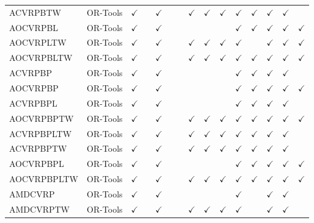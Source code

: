\documentclass{article}
\theoremstyle{plain}
\theoremstyle{definition}
\theoremstyle{remark}
\begin{document}
\begin{table}[h!]
{\begin{tabular}{l|l|cc|cccccc|ccccc}
    ACVRPBTW&OR-Tools    & $\checkmark$ & & $\checkmark$ & & & $\checkmark$ & $\checkmark$ & $\checkmark$ & $\checkmark$ & $\checkmark$ & $\checkmark$ & $\checkmark$ & \\
    AOCVRPBL&OR-Tools    & $\checkmark$ & & $\checkmark$ & & & & & & $\checkmark$ & $\checkmark$ & $\checkmark$ & $\checkmark$ & $\checkmark$ \\
    AOCVRPLTW&OR-Tools   & $\checkmark$ & & $\checkmark$ & & & $\checkmark$ & $\checkmark$ & $\checkmark$ & $\checkmark$ & & $\checkmark$ & $\checkmark$ & $\checkmark$ \\
    AOCVRPBLTW&OR-Tools  & $\checkmark$ & & $\checkmark$ & & & $\checkmark$ & $\checkmark$ & $\checkmark$ & $\checkmark$ & $\checkmark$ & $\checkmark$ & $\checkmark$ & $\checkmark$ \\
    ACVRPBP&OR-Tools     & $\checkmark$ & & $\checkmark$ & & & & & & $\checkmark$ & $\checkmark$ & $\checkmark$ & $\checkmark$ & \\
    AOCVRPBP&OR-Tools    & $\checkmark$ & & $\checkmark$ & & & & & & $\checkmark$ & $\checkmark$ & $\checkmark$ & $\checkmark$ & $\checkmark$ \\
    ACVRPBPL&OR-Tools    & $\checkmark$ & & $\checkmark$ & & & & & & $\checkmark$ & $\checkmark$ & $\checkmark$ & $\checkmark$ & \\
    AOCVRPBPTW&OR-Tools  & $\checkmark$ & & $\checkmark$ & & & $\checkmark$ & $\checkmark$ & $\checkmark$ & $\checkmark$ & $\checkmark$ & $\checkmark$ & $\checkmark$ & $\checkmark$ \\
    ACVRPBPLTW&OR-Tools   & $\checkmark$ & & $\checkmark$ & & & $\checkmark$ & $\checkmark$ & $\checkmark$ & $\checkmark$ & $\checkmark$ & $\checkmark$ & $\checkmark$ & \\
    ACVRPBPTW&OR-Tools    & $\checkmark$ & & $\checkmark$ & & & $\checkmark$ & $\checkmark$ & $\checkmark$ & $\checkmark$ & $\checkmark$ & $\checkmark$ & $\checkmark$ & \\
    AOCVRPBPL&OR-Tools   & $\checkmark$ & & $\checkmark$ & & & & & & $\checkmark$ & $\checkmark$ & $\checkmark$ & $\checkmark$ & $\checkmark$ \\
    AOCVRPBPLTW&OR-Tools  & $\checkmark$ & & $\checkmark$ & & & $\checkmark$ & $\checkmark$ & $\checkmark$ & $\checkmark$ & $\checkmark$ & $\checkmark$ & $\checkmark$ & $\checkmark$ \\
    \midrule
    AMDCVRP&OR-Tools       & $\checkmark$ & & $\checkmark$ & & & & & & $\checkmark$ & & $\checkmark$ & $\checkmark$ & \\
    AMDCVRPTW&OR-Tools     & $\checkmark$ & & $\checkmark$ & & & $\checkmark$ & $\checkmark$ & $\checkmark$ & $\checkmark$ & & $\checkmark$ & $\checkmark$ & \\

\end{tabular}}
\end{table}
\end{document}
